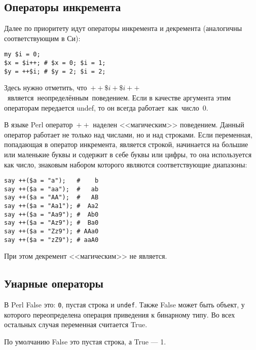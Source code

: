 \subsection{Операторы инкремента}
Далее по приоритету идут операторы инкремента и декремента (аналогичны соответствующим в Си):
\begin{verbatim}
my $i = 0;
$x = $i++; # $x = 0; $i = 1;
$y = ++$i; # $y = 2; $i = 2;
\end{verbatim}
Здесь нужно отметить, что~$++\$i + \$i++$ является неопределённым поведением.
Если в качестве аргумента этим операторам передается {undef}, то он всегда работает как число 0.

В языке Perl оператор~$++$ наделен <<магическим>> поведением. Данный оператор работает не только над числами, но и над строками. Если переменная, попадающая в оператор инкремента, является строкой, начинается на большие или маленькие буквы и содержит в себе буквы или цифры, то она используется как число, знаковым набором которого являются соответствующие диапазоны:
\begin{verbatim}
say ++($a = "a");   #    b
say ++($a = "aa");  #   ab
say ++($a = "AA");  #   AB
say ++($a = "Aa1"); #  Aa2
say ++($a = "Aa9"); #  Ab0
say ++($a = "Az9"); #  Ba0
say ++($a = "Zz9"); # AAa0
say ++($a = "zZ9"); # aaA0
\end{verbatim}
При этом декремент <<магическим>> не является.

\subsection{Унарные операторы}
В Perl False это: \verb|0|, пустая строка и \verb|undef|. Также False может быть объект, у которого переопределена операция приведения к бинарному типу. Во всех остальных случая переменная считается True.

По умолчанию False это пустая строка, а True --- 1.

